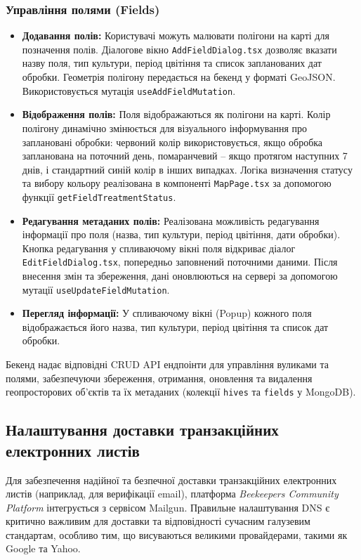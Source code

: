 \subsubsection{Управління полями (Fields)}
\begin{itemize}
    \item \textbf{Додавання полів:} Користувачі можуть малювати полігони на карті для позначення полів. Діалогове вікно \texttt{AddFieldDialog.tsx} дозволяє вказати назву поля, тип культури, період цвітіння та список запланованих дат обробки. Геометрія полігону передається на бекенд у форматі GeoJSON. Використовується мутація \texttt{useAddFieldMutation}.
    \item \textbf{Відображення полів:} Поля відображаються як полігони на карті. Колір полігону динамічно змінюється для візуального інформування про заплановані обробки: червоний колір використовується, якщо обробка запланована на поточний день, помаранчевий – якщо протягом наступних 7 днів, і стандартний синій колір в інших випадках. Логіка визначення статусу та вибору кольору реалізована в компоненті \texttt{MapPage.tsx} за допомогою функції \texttt{getFieldTreatmentStatus}.
    \item \textbf{Редагування метаданих полів:} Реалізована можливість редагування інформації про поля (назва, тип культури, період цвітіння, дати обробки). Кнопка редагування у спливаючому вікні поля відкриває діалог \texttt{EditFieldDialog.tsx}, попередньо заповнений поточними даними. Після внесення змін та збереження, дані оновлюються на сервері за допомогою мутації \texttt{useUpdateFieldMutation}.
    \item \textbf{Перегляд інформації:} У спливаючому вікні (Popup) кожного поля відображається його назва, тип культури, період цвітіння та список дат обробки.
\end{itemize}

Бекенд надає відповідні CRUD API ендпоінти для управління вуликами та полями, забезпечуючи збереження, отримання, оновлення та видалення геопросторових об'єктів та їх метаданих (колекції \texttt{hives} та \texttt{fields} у MongoDB).

\subsection{Налаштування доставки транзакційних електронних листів}
\label{subsec:email_delivery}

Для забезпечення надійної та безпечної доставки транзакційних електронних листів (наприклад, для верифікації email), платформа \textit{Beekeepers Community Platform} інтегрується з сервісом Mailgun. Правильне налаштування DNS є критично важливим для доставки та відповідності сучасним галузевим стандартам, особливо тим, що висуваються великими провайдерами, такими як Google та Yahoo.

